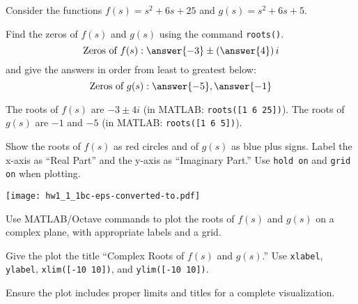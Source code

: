 \documentclass{ximera}
\author{Jont Allen}
\begin{document}
\begin{problem}
    Consider the functions \(f(s) = s^2 + 6s + 25\) and \(g(s) = s^2 + 6s + 5\).
    
    Find the zeros of \(f(s)\) and \(g(s)\) using the command \texttt{roots()}.
    \[
    \text{Zeros of } f(s): \answer{-3} \pm \left(\answer{4}\right)i
    \]
    and give the answers in order from least to greatest below:
    \[
    \text{Zeros of } g(s): \answer{-5}, \answer{-1}
    \]
    \begin{feedback}[correct]
    The roots of \(f(s)\) are \(-3 \pm 4i\) (in MATLAB: \texttt{roots([1 6 25])}). The roots of \(g(s)\) are \(-1\) and \(-5\) (in MATLAB: \texttt{roots([1 6 5])}).
    \end{feedback}
\end{problem}

\begin{problem}
    Show the roots of \(f(s)\) as red circles and of \(g(s)\) as blue plus signs.
    Label the x-axis as ``Real Part'' and the y-axis as ``Imaginary Part.'' Use \texttt{hold on} and \texttt{grid on} when plotting.
\begin{center}
\texttt{[image: hw1\_1\_1bc-eps-converted-to.pdf]}
\end{center}
    \begin{feedback}[correct]
    Use MATLAB/Octave commands to plot the roots of \(f(s)\) and \(g(s)\) on a complex plane, with appropriate labels and a grid.
    \end{feedback}
\end{problem}

\begin{problem}
    Give the plot the title ``Complex Roots of \(f(s)\) and \(g(s)\).'' Use \texttt{xlabel}, \texttt{ylabel}, \texttt{xlim([-10 10])}, and \texttt{ylim([-10 10])}.
    \begin{multipleChoice}
    \end{multipleChoice}
    \begin{feedback}[correct]
    Ensure the plot includes proper limits and titles for a complete visualization.
    \end{feedback}
\end{problem}
\end{document}
